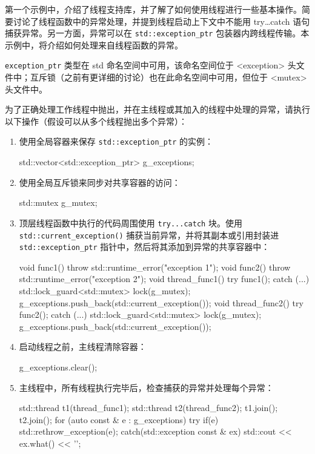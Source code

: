 第一个示例中，介绍了线程支持库，并了解了如何使用线程进行一些基本操作。简要讨论了线程函数中的异常处理，并提到线程启动上下文中不能用 try…catch 语句捕获异常。另一方面，异常可以在 \verb|std::exception_ptr| 包装器内跨线程传输。本示例中，将介绍如何处理来自线程函数的异常。


\verb|exception_ptr| 类型在 std 命名空间中可用，该命名空间位于 <exception> 头文件中；互斥锁（之前有更详细的讨论）也在此命名空间中可用，但位于 <mutex> 头文件中。


为了正确处理工作线程中抛出，并在主线程或其加入的线程中处理的异常，请执行以下操作（假设可以从多个线程抛出多个异常）：

\begin{enumerate}
\item
使用全局容器来保存 \verb|std::exception_ptr| 的实例：

\begin{cpp}
std::vector<std::exception_ptr> g_exceptions;
\end{cpp}

\item
使用全局互斥锁来同步对共享容器的访问：

\begin{cpp}
std::mutex g_mutex;
\end{cpp}

\item
顶层线程函数中执行的代码周围使用 \verb|try...catch| 块。使用 \verb|std::current_exception()| 捕获当前异常，并将其副本或引用封装进 \verb|std::exception_ptr| 指针中，然后将其添加到异常的共享容器中：

\begin{cpp}
void func1()
{
    throw std::runtime_error("exception 1");
}
void func2()
{
    throw std::runtime_error("exception 2");
}
void thread_func1()
{
    try
    {
        func1();
    }
    catch (...)
    {
        std::lock_guard<std::mutex> lock(g_mutex);
        g_exceptions.push_back(std::current_exception());
    }
}
void thread_func2()
{
    try
    {
        func2();
    }
    catch (...)
    {
        std::lock_guard<std::mutex> lock(g_mutex);
        g_exceptions.push_back(std::current_exception());
    }
}
\end{cpp}

\item
启动线程之前，主线程清除容器：

\begin{cpp}
g_exceptions.clear();
\end{cpp}

\item
主线程中，所有线程执行完毕后，检查捕获的异常并处理每个异常：

\begin{cpp}
std::thread t1(thread_func1);
std::thread t2(thread_func2);
t1.join();
t2.join();
for (auto const & e : g_exceptions)
{
    try
    {
        if(e)
        std::rethrow_exception(e);
    }
    catch(std::exception const & ex)
    {
        std::cout << ex.what() << '\n';
    }
}
\end{cpp}
\end{enumerate}


